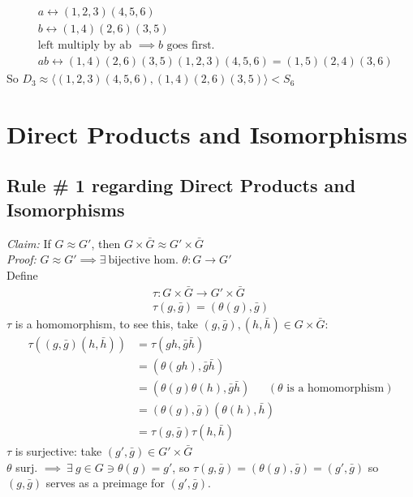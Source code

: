 \begin{align}
    &a \longleftrightarrow (1,2,3)(4,5,6) \nonumber \\
    &b \longleftrightarrow (1,4)(2,6)(3,5) \nonumber \\
    &\text{left multiply by ab }\implies b \text{ goes first.} \nonumber \\
    &ab \longleftrightarrow (1,4)(2,6)(3,5)(1,2,3)(4,5,6)=(1,5)(2,4)(3,6) \nonumber 
\end{align}
So $D_3 \approx \langle (1,2,3)(4,5,6), (1,4)(2,6)(3,5) \rangle < S_6$

\section*{Direct Products and Isomorphisms}
\subsection*{Rule \# 1 regarding Direct Products and Isomorphisms}
\textit{Claim:} If $G\approx G'$, then $G\times \bar{G}\approx G'\times \bar{G}$ \steezybreak\\
\textit{Proof:} $G\approx G' \implies \exists \ \text{bijective hom. }\theta : G\rightarrow G'$ \steezybreak\\
Define 
\begin{align}
    \tau: G\times \bar{G} \rightarrow G'\times \bar{G} \nonumber \\
    \tau(g,\bar{g}) = (\theta(g),\bar{g}) \nonumber
\end{align}
$\tau$ is a homomorphism, to see this, take $(g,\bar{g}), (h,\bar{h})\in G\times \bar{G}$:
\begin{align}
    \tau((g,\bar{g})(h,\bar{h}))&=\tau(gh,\bar{g}\bar{h}) \nonumber \\
    &= (\theta(gh),\bar{g}\bar{h}) \nonumber \\
    &= (\theta(g)\theta(h),\bar{g}\bar{h}) \ \ \ \ \ \ \ (\theta \text{ is a homomorphism}) \nonumber \\
    &= (\theta(g),\bar{g})(\theta(h),\bar{h}) \nonumber \\
    &= \tau(g,\bar{g})\tau(h,\bar{h}) \nonumber
\end{align}
$\tau$ is surjective: take $(g',\bar{g})\in G'\times \bar{G}$ \steezybreak\\
$\theta$ surj. $\implies \ \exists \ g\in G \ni \theta(g)=g'$, so $\tau(g,\bar{g})=(\theta(g),\bar{g})=(g',\bar{g})$ so $(g,\bar{g})$ serves as a preimage for $(g',\bar{g})$. \steezybreak\\
